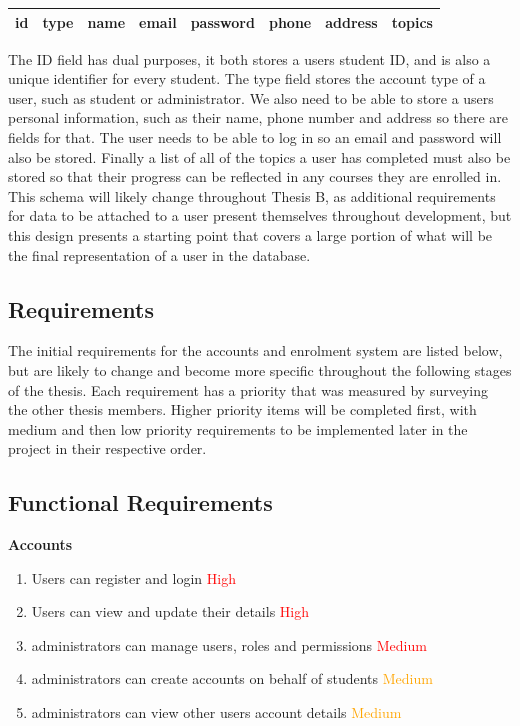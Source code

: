 \begin{center}
    \begin{tabular}{|c|c|c|c|c|c|c|c|} 
        \hline
        id & type & name & email & password & phone & address & topics \\ [0.5ex] 
        \hline
    \end{tabular}
\end{center}

The ID field has dual purposes, it both stores a users student ID, and is also a unique identifier for every student. The type field stores the account type of a user, such as student or administrator. We also need to be able to store a users personal information, such as their name, phone number and address so there are fields for that. The user needs to be able to log in so an email and password will also be stored. Finally a list of all of the topics a user has completed must also be stored so that their progress can be reflected in any courses they are enrolled in.\\

This schema will likely change throughout Thesis B, as additional requirements for data to be attached to a user present themselves throughout development, but this design presents a starting point that covers a large portion of what will be the final representation of a user in the database.

\subsection{Requirements}
The initial requirements for the accounts and enrolment system are listed below, but are likely to change and become more specific throughout the following stages of the thesis. Each requirement has a priority that was measured by surveying the other thesis members. Higher priority items will be completed first, with medium and then low priority requirements to be implemented later in the project in their respective order.

\subsection{Functional Requirements}
\textbf{Accounts}
    \begin{enumerate}
    \item Users can register and login \textcolor{Red}{High}
    \item Users can view and update their details \textcolor{Red}{High}
    \item administrators can manage users, roles and permissions \textcolor{Red}{Medium}
    \item administrators can create accounts on behalf of students \textcolor{Orange}{Medium}
    \item administrators can view other users account details \textcolor{Orange}{Medium}
    \end{enumerate}

